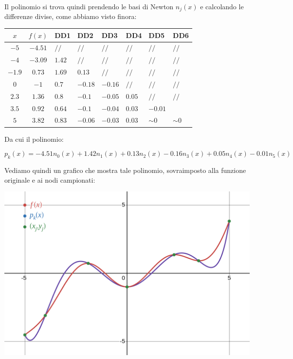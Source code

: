 \documentclass[a4paper,11pt]{article}
\begin{document}
Il polinomio si trova quindi prendendo le basi di Newton $n_j(x)$ e calcolando le differenze divise, come abbiamo visto finora:

\begin{table}[H]
	\center 
	\begin{tabular} { c | c | p{1cm} p{1cm} p{1cm} p{1cm} p{1cm} p{1cm} }
		$x$ & $f(x)$ & DD1 & DD2 & DD3 & DD4 & DD5 & DD6 \\
		\hline
		$-5 $ & $ -4.51 $ & $ // $ & $ // $ & $ // $ & $ // $ & $ // $ & $ // $ \\
		$-4 $ & $ -3.09 $ & $ 1.42 $ & $ // $ & $ // $ & $ // $ & $ // $ & $ // $ \\
		$-1.9 $ & $ 0.73 $ & $ 1.69 $ & $ 0.13 $ & $ // $ & $ // $ & $ // $ & $ // $ \\
		$0 $ & $ -1 $ & $ 0.7 $ & $ -0.18 $ & $ -0.16 $ & $ // $ & $ // $ & $ // $ \\
		$2.3 $ & $ 1.36 $ & $ 0.8 $ & $ -0.1 $ & $ -0.05 $ & $ 0.05 $ & $ // $ & $ // $ \\
		$3.5 $ & $ 0.92 $ & $ 0.64 $ & $ -0.1 $ & $ -0.04 $ & $ 0.03 $ & $ -0.01 $ \\
		$5 $ & $ 3.82 $ & $ 0.83 $ & $ -0.06 $ & $ -0.03 $ & $ 0.03 $ & $ \sim0 $ & $ \sim0$ 
	\end{tabular}
\end{table}

Da cui il polinomio:

$$
p_k(x) = -4.51 n_0(x) + 1.42 n_1(x) + 0.13 n_2(x) - 0.16 n_3(x) + 0.05 n_4(x) - 0.01 n_5(x)
$$

Vediamo quindi un grafico che mostra tale polinomio, sovraimposto alla funzione originale e ai nodi campionati:

\begin{center}
	\includegraphics[scale=0.3]{../figures/newton_interpol.png}
\end{center}
\end{document}
